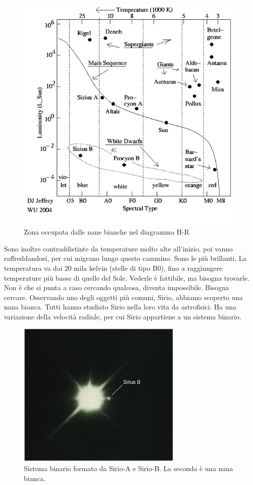 \documentclass[a4paper,11pt]{article}
\begin{document}
\begin{figure}[h!!]
        \centering
        \includegraphics[width=12cm]{lezione 28 novembre/nanebianche.png}
        \caption{Zona occupata dalle nane bianche nel diagramma H-R}
        \label{lezione 28 novembre/nanebianche.png}
    \end{figure}
Sono inoltre contraddistinte da temperature molto alte all'inizio, poi vanno raffreddandosi, per cui migrano lungo questo cammino. Sono le più brillanti. La temperatura va dai 20 mila kelvin (stelle di tipo B0), fino a raggiungere temperature più basse di quelle del Sole. Vederle è fattibile, ma bisogna trovarle. Non è che si punta a caso cercando qualcosa, diventa impossibile. Bisogna cercare. Osservando uno degli oggetti più comuni, Sirio, abbiamo scoperto una nana bianca. Tutti hanno studiato Sirio nella loro vita da astrofisici. Ha una variazione della velocità radiale, per cui Sirio appartiene a un sistema binario. 
\begin{figure}[h!!]
        \centering
        \includegraphics[width=8cm]{lezione 28 novembre/siriob.jpg}
        \caption{Sistema binario formato da Sirio-A e Sirio-B. La seconda è una nana bianca.}
        \label{lezione 28 novembre/nanebianche.png}
    \end{figure}
\end{document}
